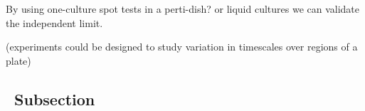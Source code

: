 By using one-culture spot tests in a perti-dish? or liquid cultures we
can validate the independent limit.


(experiments could be designed to study variation in timescales over
regions of a plate)


\subsection{\thesubsection~Subsection}

